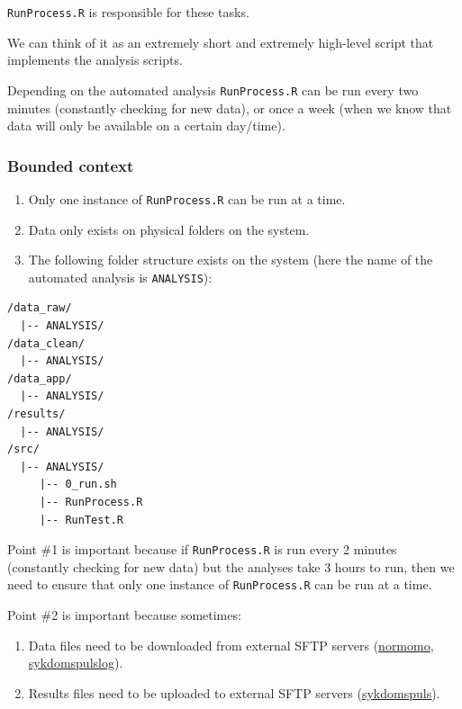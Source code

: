\documentclass[12pt,]{article}
\providecommand{\tightlist}{%
  \setlength{\itemsep}{0pt}\setlength{\parskip}{0pt}}
\begin{document}
\texttt{RunProcess.R} is responsible for these tasks.

We can think of it as an extremely short and extremely high-level script
that implements the analysis scripts.

Depending on the automated analysis \texttt{RunProcess.R} can be run
every two minutes (constantly checking for new data), or once a week
(when we know that data will only be available on a certain day/time).

\subsubsection{Bounded context}\label{bounded-context}

\begin{enumerate}
\def\labelenumi{\arabic{enumi}.}
\tightlist
\item
  Only one instance of \texttt{RunProcess.R} can be run at a time.
\item
  Data only exists on physical folders on the system.
\item
  The following folder structure exists on the system (here the name of
  the automated analysis is \texttt{ANALYSIS}):
\end{enumerate}

\begin{verbatim}
/data_raw/
  |-- ANALYSIS/
/data_clean/
  |-- ANALYSIS/
/data_app/
  |-- ANALYSIS/
/results/
  |-- ANALYSIS/
/src/
  |-- ANALYSIS/
     |-- 0_run.sh
     |-- RunProcess.R
     |-- RunTest.R
\end{verbatim}

Point \#1 is important because if \texttt{RunProcess.R} is run every 2
minutes (constantly checking for new data) but the analyses take 3 hours
to run, then we need to ensure that only one instance of
\texttt{RunProcess.R} can be run at a time.

Point \#2 is important because sometimes:

\begin{enumerate}
\def\labelenumi{\arabic{enumi}.}
\tightlist
\item
  Data files need to be downloaded from external SFTP servers
  (\href{https://folkehelseinstituttet.github.io/dashboards_normomo/}{normomo},
  \href{https://folkehelseinstituttet.github.io/dashboards_sykdomspuls_log/}{sykdomspulslog}).
\item
  Results files need to be uploaded to external SFTP servers
  (\href{https://folkehelseinstituttet.github.io/dashboards_sykdomspuls/}{sykdomspuls}).
\end{enumerate}
\end{document}
